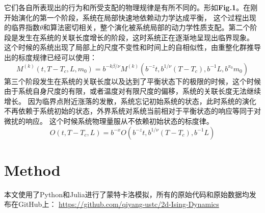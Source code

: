 \documentclass[a4paper]{article}
\begin{document}
它们各自所表现出的行为和所受支配的物理规律是有所不同的。形如\textbf{Fig.1}。在刚开始演化的第一个阶段，系统在局部快速地依赖动力学达成平衡，
这个过程出现的临界指数$\theta$和算法密切相关，整个演化被系统局部的动力学性质支配。第二个阶段是发生在系统的关联长度增长的阶段，这时系统正在逐渐地呈现出临界现象。
这个时候的系统出现了局部上的尺度不变性和时间上的自相似性，由重整化群推导出的标度规律已经可以使用：
$$M^{(k)}(t,T-T_c,L,m_0)=b^{-k\beta/\nu}M^{(k)}(b^{-z}t,b^{1/\nu}(T-T_c),b^{-1}L,b^{x_0}m_0)$$
第三个阶段发生在系统的关联长度以及达到了平衡状态下的极限的时候，这个时候由于系统自身尺度的有限，或者温度对有限尺度的偏移，系统的关联长度无法继续增长。
因为临界点附近涨落的发散，系统忘记初始系统的状态，此时系统的演化不再依赖于系统初始的状态，外界系统对系统当前相对于平衡状态的响应等同于对微扰的响应。
这个时候系统物理量服从不依赖初始状态的标度律。
$$O(t,T-T_c,L)=b^{-x}O(b^{-z}t,b^{1/\nu}(T-T_c),b^{-1}L)$$
\section{Method}
本文使用了Python和Julia进行了蒙特卡洛模拟，所有的原始代码和原始数据均发布在GitHub上： 
\url{https://github.com/qiyang-ustc/2d-Ising-Dynamics}
\end{document}
